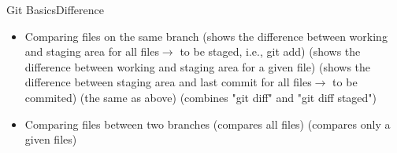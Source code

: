 \begin{frame}{Git Basics}{Difference}
\begin{itemize}
\item Comparing files on the same branch
   (shows the difference between working and staging area for all files$\rightarrow$ to be staged, i.e., git add)
 (shows the difference between working and staging area for a given file)
 (shows the difference between staging area and last commit for all files$\rightarrow$ to be commited)
 (the same as above)
 (combines "git diff" and "git diff \dhyphen staged")
\item Comparing files between two branches
   (compares all files)
   (compares only a given files)
\end{itemize}
\end{frame}
